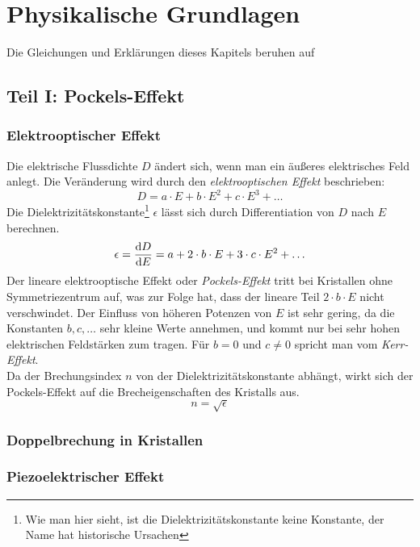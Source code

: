 \section{Physikalische Grundlagen}
Die Gleichungen und Erklärungen dieses Kapitels beruhen auf \cite{herrmann}
\subsection{Teil I: Pockels-Effekt}

\subsubsection{Elektrooptischer Effekt}
Die elektrische Flussdichte $D$ ändert sich, wenn man ein äußeres elektrisches Feld anlegt. Die Veränderung wird 
durch den \emph{elektrooptischen Effekt} beschrieben:
\begin{equation}
\label{eq:eoeff}
  D = a \cdot E + b \cdot E^2 + c \cdot E^3 + \ldots
\end{equation}
Die Dielektrizitätskonstante\footnote{Wie man hier sieht, ist die Dielektrizitätskonstante keine Konstante, der Name hat historische Ursachen} 
$\epsilon$ lässt sich durch Differentiation von $D$ nach $E$ berechnen.
\begin{equation}
\label{eq:dielconst}
  \epsilon = \frac{\mathrm{d} D}{\mathrm{d} E} = a + 2 \cdot b \cdot E + 3 \cdot c \cdot E^2 + \ldots
\end{equation}
Der lineare elektrooptische Effekt oder \emph{Pockels-Effekt} tritt bei Kristallen ohne Symmetriezentrum auf, was zur Folge hat, dass 
der lineare Teil $2 \cdot b \cdot E$ nicht verschwindet. Der Einfluss von höheren Potenzen von $E$ ist sehr gering, da die Konstanten $b, c, \ldots$ sehr 
kleine Werte annehmen, und kommt nur bei sehr hohen elektrischen Feldstärken zum tragen. 
Für $b = 0$ und $c \neq 0$ spricht man vom \emph{Kerr-Effekt}. \\
Da der Brechungsindex $n$ von der Dielektrizitätskonstante abhängt, wirkt sich der Pockels-Effekt auf die Brecheigenschaften des Kristalls aus.
\begin{equation}
  n = \sqrt{\epsilon}
\end{equation}


\subsubsection{Doppelbrechung in Kristallen}

\subsubsection{Piezoelektrischer Effekt}

